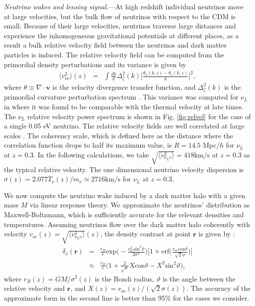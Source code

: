 \documentclass[aps,prl,twocolumn,showpacs,superscriptaddress,groupedaddress,nofootinbib]{revtex4}  %
\newcommand{\mr}{\mathrm}
\begin{document}
{\it Neutrino wakes and lensing signal.}---At 
high redshift individual neutrinos move at
large velocities, but the bulk flow of neutrinos with respect to 
the CDM is small.  Because of their large velocities, 
neutrinos traverse large distances
and experience the inhomogeneous gravitational potentials at different places,
as a result a bulk relative velocity field between the neutrinos and 
dark matter particles is induced.
The relative velocity field can be computed from the primordial density
perturbations and its variance is given by 
\begin{eqnarray}
\label{v_nuc}
\langle v^2_{\nu c}\rangle(z)
&=& \int \frac{dk}{k}\Delta^2_{\zeta}(k)\bigg[ \frac{\theta_\nu (k, z) - \theta_c (k, z)}{k} \bigg]^2, 
\end{eqnarray}
where $\theta\equiv\nabla\cdot{\bm v}$ is the velocity divergence
transfer function, and $\Delta^2_\zeta(k)$ is the primordial curvature
perturbation spectrum \cite{Zhu:2013}.
This variance was computed for $\nu_L$ in \cite{Zhu:2013} where it was
found to be comparable with the thermal velocity at late times. The $\nu_L$
relative velocity power spectrum is shown in Fig. \ref{fig:relvel} for the
case of a single 0.05 eV neutrino.
The relative velocity fields are well correlated at large 
scales \cite{Zhu:2013}. The coherency scale, which is defined here as the 
distance where the correlation function drops to half its maximum value,
is $R=14.5$ Mpc/$h$ for $\nu_L$ at $z=0.3$. 
In the following calculations, 
we take $\sqrt{\langle v^2_{\nu_L c}\rangle}=418\mr{km/s}$ at $z=0.3$ 
as the typical relative velocity. The one dimensional neutrino velocity 
dispersion is $\sigma(z)=2.077T_{\nu}(z)/m_\nu\simeq2716\mr{km/s}$ 
for $\nu_L$ at $z=0.3$.

We now compute the neutrino wake induced by a dark matter halo with a
given mass $M$ via linear response theory. 
We approximate the neutrinos' distribution as Maxwell-Boltzmann, 
which is sufficiently accurate for the relevant densities and temperatures.
Assuming neutrinos
flow over the dark matter halo coherently with velocity $v_{\nu c}(z)
=\sqrt{\langle v^2_{\nu_L c}\rangle}(z)$, the density contrast at point
$\bm{r}$ is given by \cite{Binney:2008}:
\begin{eqnarray}
  \label{delta_nu}
  \delta_\nu(\bm{r})
  &=&\frac{r_B}{r}
  \mr{exp}\bigg(-\frac{v_{\nu c}^2\mr{sin}^2\vartheta}{2\sigma^2}\bigg)
  \bigg[1+\mr{erf}\bigg(\frac{v_{\nu
      c}\mr{cos}\vartheta}{\sqrt{2}\sigma}\bigg)\bigg] \nonumber \\
  &\approx&\frac{r_B}{r}
  \bigg(1+\frac{2}{\sqrt{\pi}}X\mr{cos}\vartheta-X^2\mr{sin}^2\vartheta\bigg),
\end{eqnarray}
where $r_B(z) = GM/\sigma^2(z)$ is the Bondi radius, $\vartheta$ is the
angle between the relative velocity and $\bm{r}$, and $X(z)=v_{\nu
  c}(z)/(\sqrt{2}\sigma(z))$. The accuracy of the approximate form in 
the second line is better than 95\% for the cases we consider.
\end{document}
